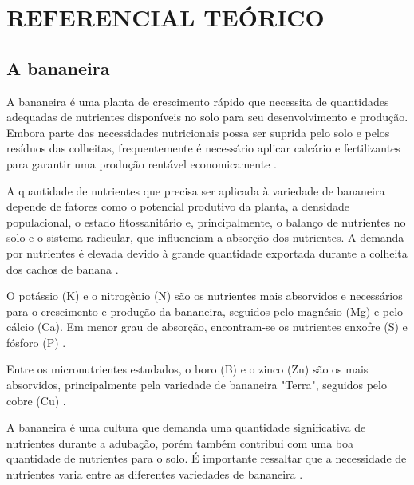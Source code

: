 
\chapter{REFERENCIAL TEÓRICO}
\section{A bananeira}
A bananeira é uma planta de crescimento rápido que necessita de quantidades adequadas de nutrientes disponíveis no solo para seu desenvolvimento e produção. Embora parte das necessidades nutricionais possa ser suprida pelo solo e pelos resíduos das colheitas, frequentemente é necessário aplicar calcário e fertilizantes para garantir uma produção rentável economicamente \cite{culturabanana}.

A quantidade de nutrientes que precisa ser aplicada à variedade de bananeira depende de fatores como o potencial produtivo da planta, a densidade populacional, o estado fitossanitário e, principalmente, o balanço de nutrientes no solo e o sistema radicular, que influenciam a absorção dos nutrientes. A demanda por nutrientes é elevada devido à grande quantidade exportada durante a colheita dos cachos de banana \cite{culturabanana}.

O potássio (K) e o nitrogênio (N) são os nutrientes mais absorvidos e necessários para o crescimento e produção da bananeira, seguidos pelo magnésio (Mg) e pelo cálcio (Ca). Em menor grau de absorção, encontram-se os nutrientes enxofre (S) e fósforo (P) \cite{culturabanana}.

Entre os micronutrientes estudados, o boro (B) e o zinco (Zn) são os mais absorvidos, principalmente pela variedade de bananeira "Terra", seguidos pelo cobre (Cu) \cite{culturabanana}.

A bananeira é uma cultura que demanda uma quantidade significativa de nutrientes durante a adubação, porém também contribui com uma boa quantidade de nutrientes para o solo. É importante ressaltar que a necessidade de nutrientes varia entre as diferentes variedades de bananeira \cite{culturabanana}.

